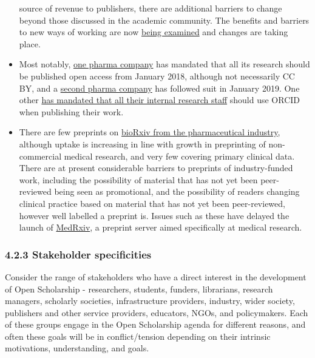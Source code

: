 \begin{itemize}
  source of revenue to publishers, there are additional barriers to
  change beyond those discussed in the academic community. The benefits
  and barriers to new ways of working are now
  \href{https://openpharma.blog/}{being examined} and changes are taking
  place.
\item
  Most notably,
  \href{https://www.shire.com/en/newsroom/2018/january/xajhds}{one
  pharma company} has mandated that all its research should be published
  open access from January 2018, although not necessarily CC BY, and a
  \href{https://www.ipsen.com/ipsen-commits-to-making-all-its-published-scientific-research-freely-accessible-to-everyone/}{second
  pharma company} has followed suit in January 2019. One other
  \href{https://doi.org/10.21305/ISMPPEU2018.001}{has mandated that all
  their internal research staff} should use ORCID when publishing their
  work.
\item
  There are few preprints on
  \href{https://openpharma.blog/2018/05/31/what-do-preprints-mean-for-medical-publishing/}{bioRxiv
  from the pharmaceutical industry}, although uptake is increasing in
  line with growth in preprinting of non-commercial medical research,
  and very few covering primary clinical data. There are at present
  considerable barriers to preprints of industry-funded work, including
  the possibility of material that has not yet been peer-reviewed being
  seen as promotional, and the possibility of readers changing clinical
  practice based on material that has not yet been peer-reviewed,
  however well labelled a preprint is. Issues such as these have delayed
  the launch of \href{http://yoda.yale.edu/medrxiv}{MedRxiv}, a preprint
  server aimed specifically at medical research.
\end{itemize}

\subsubsection{4.2.3 Stakeholder
specificities}\label{stakeholder-specificities}

Consider the range of stakeholders who have a direct interest in the
development of Open Scholarship - researchers, students, funders,
librarians, research managers, scholarly societies, infrastructure
providers, industry, wider society, publishers and other service
providers, educators, NGOs, and policymakers. Each of these groups
engage in the Open Scholarship agenda for different reasons, and often
these goals will be in conflict/tension depending on their intrinsic
motivations, understanding, and goals.

